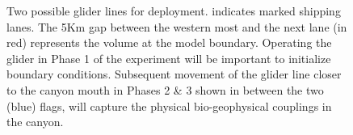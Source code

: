\begin{figure}[!b]
  \centering 
  \hspace{+0.3cm} 
  \caption{Two possible \soc glider lines for
    deployment.  indicates marked shipping
    lanes. The 5Km  gap between the western most and the next lane
    (in red) represents the volume at the model boundary. Operating
    the glider in Phase 1 of the experiment will be important to
    initialize boundary conditions. Subsequent movement of the glider
    line closer to the \naz canyon mouth in Phases 2 \& 3 shown in
     between the two (blue) flags, will capture
    the physical bio-geophysical couplings in the \naz canyon.}
  \label{fig:glider-ops}
\end{figure}


